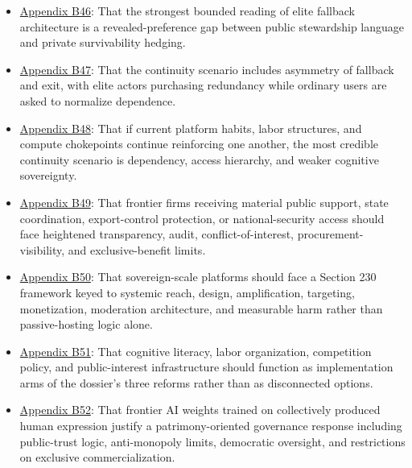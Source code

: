 \documentclass[
  american,
  11pt,
  letterpaper,
]{article}
\begin{document}
\begin{itemize}
  not only by boards, policy essays, and lobbying, but by operational
  state interfaces that normalize privileged access and public-private
  dependence.
\item
  \hyperref[ch-10-appendix-b46-the-strongest-bounded-reading-of-elite-fallback-architecture-is-a-revealed-prefer]{Appendix
  B46}: That the strongest bounded reading of elite fallback
  architecture is a revealed-preference gap between public stewardship
  language and private survivability hedging.
\item
  \hyperref[ch-10-appendix-b47-the-continuity-scenario-includes-asymmetry-of-fallback-and-exit-with-elite-actor]{Appendix
  B47}: That the continuity scenario includes asymmetry of fallback and
  exit, with elite actors purchasing redundancy while ordinary users are
  asked to normalize dependence.
\item
  \hyperref[ch-10-appendix-b48-if-current-platform-habits-labor-structures-and-compute-chokepoints-continue-re]{Appendix
  B48}: That if current platform habits, labor structures, and compute
  chokepoints continue reinforcing one another, the most credible
  continuity scenario is dependency, access hierarchy, and weaker
  cognitive sovereignty.
\item
  \hyperref[ch-10-appendix-b49-frontier-firms-receiving-material-public-support-state-coordination-export-cont]{Appendix
  B49}: That frontier firms receiving material public support, state
  coordination, export-control protection, or national-security access
  should face heightened transparency, audit, conflict-of-interest,
  procurement-visibility, and exclusive-benefit limits.
\item
  \hyperref[ch-10-appendix-b50-sovereign-scale-platforms-should-face-a-section-230-framework-keyed-to-systemic-r]{Appendix
  B50}: That sovereign-scale platforms should face a Section 230
  framework keyed to systemic reach, design, amplification, targeting,
  monetization, moderation architecture, and measurable harm rather than
  passive-hosting logic alone.
\item
  \hyperref[ch-10-appendix-b51-cognitive-literacy-labor-organization-competition-policy-and-public-interest-i]{Appendix
  B51}: That cognitive literacy, labor organization, competition policy,
  and public-interest infrastructure should function as implementation
  arms of the dossier's three reforms rather than as disconnected
  options.
\item
  \hyperref[ch-10-appendix-b52-frontier-ai-weights-trained-on-collectively-produced-human-expression-justify-a-p]{Appendix
  B52}: That frontier AI weights trained on collectively produced human
  expression justify a patrimony-oriented governance response including
  public-trust logic, anti-monopoly limits, democratic oversight, and
  restrictions on exclusive commercialization.
\end{itemize}
\end{document}

